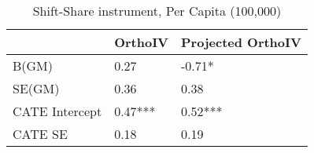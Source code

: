 \begin{table}\centering\caption{Shift-Share instrument, Per Capita (100,000)}\begin{tabular}{lll}
\toprule
                & OrthoIV   & Projected OrthoIV   \\
\midrule
 B(GM)          & 0.27      & -0.71*              \\
 SE(GM)         & 0.36      & 0.38                \\
 CATE Intercept & 0.47***   & 0.52***             \\
 CATE SE        & 0.18      & 0.19                \\
\bottomrule
\end{tabular}\end{table}